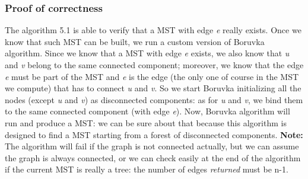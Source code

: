 \subsubsection{Proof of correctness}
The algorithm 5.1 is able to verify that a MST with edge \textit{e} really exists. Once we know that such MST can be built, we run a custom version of Boruvka algorithm. Since we know that a MST with edge \textit{e} exists, we also know that \textit{u} and \textit{v} belong to the same connected component; moreover, we know that the edge \textit{e} must be part of the MST and \textit{e} is the edge (the only one of course in the MST we compute) that has to connect \textit{u} and \textit{v}. So we start Boruvka initializing all the nodes (except \textit{u} and \textit{v}) as disconnected components: as for \textit{u} and \textit{v}, we bind them to the same connected component (with edge \textit{e}). Now, Boruvka algorithm will run and produce a MST: we can be sure about that because this algorithm is designed to find a MST starting from a forest of disconnected components. \textbf{Note:} The algorithm will fail if the graph is not connected actually, but we can assume the graph is always connected, or we can check easily at the end of the algorithm if the current MST is really a tree: the number of edges \textit{returned} must be n-1. 